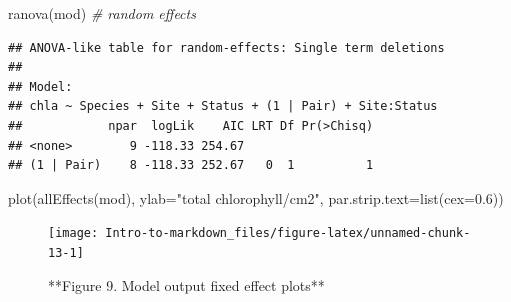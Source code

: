 \documentclass[
]{article}
\newenvironment{Shaded}{\begin{snugshade}}{\end{snugshade}}
\newcommand{\AttributeTok}[1]{\textcolor[rgb]{0.77,0.63,0.00}{#1}}
\newcommand{\CommentTok}[1]{\textcolor[rgb]{0.56,0.35,0.01}{\textit{#1}}}
\newcommand{\FloatTok}[1]{\textcolor[rgb]{0.00,0.00,0.81}{#1}}
\newcommand{\FunctionTok}[1]{\textcolor[rgb]{0.00,0.00,0.00}{#1}}
\newcommand{\NormalTok}[1]{#1}
\newcommand{\StringTok}[1]{\textcolor[rgb]{0.31,0.60,0.02}{#1}}
\begin{document}
\begin{Shaded}
\begin{Highlighting}[]
\FunctionTok{ranova}\NormalTok{(mod) }\CommentTok{\# random effects}
\end{Highlighting}
\end{Shaded}

\begin{verbatim}
## ANOVA-like table for random-effects: Single term deletions
## 
## Model:
## chla ~ Species + Site + Status + (1 | Pair) + Site:Status
##            npar  logLik    AIC LRT Df Pr(>Chisq)
## <none>        9 -118.33 254.67                  
## (1 | Pair)    8 -118.33 252.67   0  1          1
\end{verbatim}

\begin{Shaded}
\begin{Highlighting}[]
\FunctionTok{plot}\NormalTok{(}\FunctionTok{allEffects}\NormalTok{(mod), }\AttributeTok{ylab=}\StringTok{"total chlorophyll/cm2"}\NormalTok{, }\AttributeTok{par.strip.text=}\FunctionTok{list}\NormalTok{(}\AttributeTok{cex=}\FloatTok{0.6}\NormalTok{))}
\end{Highlighting}
\end{Shaded}

\begin{figure}

{\centering \texttt{[image: Intro-to-markdown\_files/figure-latex/unnamed-chunk-13-1]} 

}

\caption{**Figure 9. Model output fixed effect plots**}\label{fig:unnamed-chunk-13}
\end{figure}
\end{document}
